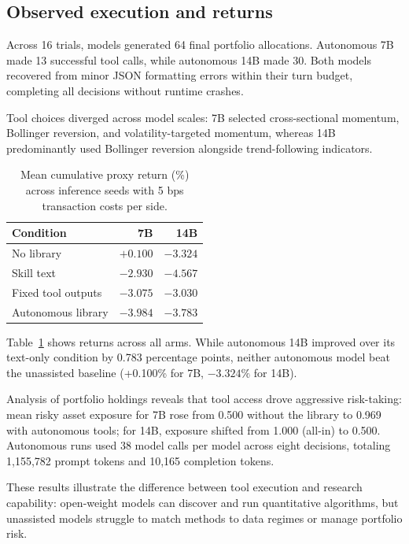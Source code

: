 \subsection{Observed execution and returns}
Across 16 trials, models generated 64 final portfolio allocations. Autonomous 7B made 13
successful tool calls, while autonomous 14B made 30. Both models recovered from minor
JSON formatting errors within their turn budget, completing all decisions without
runtime crashes.

Tool choices diverged across model scales: 7B selected cross-sectional momentum,
Bollinger reversion, and volatility-targeted momentum, whereas 14B predominantly used
Bollinger reversion alongside trend-following indicators.

\begin{table}[t]
\centering\small
\begin{tabular}{lrr}
\toprule
Condition & 7B & 14B \\
\midrule
No library & $+0.100$ & $-3.324$ \\
Skill text & $-2.930$ & $-4.567$ \\
Fixed tool outputs & $-3.075$ & $-3.030$ \\
Autonomous library & $-3.984$ & $-3.783$ \\
\bottomrule
\end{tabular}
\caption{Mean cumulative proxy return (\%) across inference seeds with 5 bps transaction costs per side.}
\label{tab:autonomous}
\end{table}

Table~\ref{tab:autonomous} shows returns across all arms. While autonomous 14B improved
over its text-only condition by 0.783 percentage points, neither autonomous model beat
the unassisted baseline (+0.100\% for 7B, $-3.324\%$ for 14B).

Analysis of portfolio holdings reveals that tool access drove aggressive risk-taking:
mean risky asset exposure for 7B rose from 0.500 without the library to 0.969 with
autonomous tools; for 14B, exposure shifted from 1.000 (all-in) to 0.500. Autonomous
runs used 38 model calls per model across eight decisions, totaling 1,155,782 prompt
tokens and 10,165 completion tokens.

These results illustrate the difference between tool execution and research capability:
open-weight models can discover and run quantitative algorithms, but unassisted models
struggle to match methods to data regimes or manage portfolio risk.


